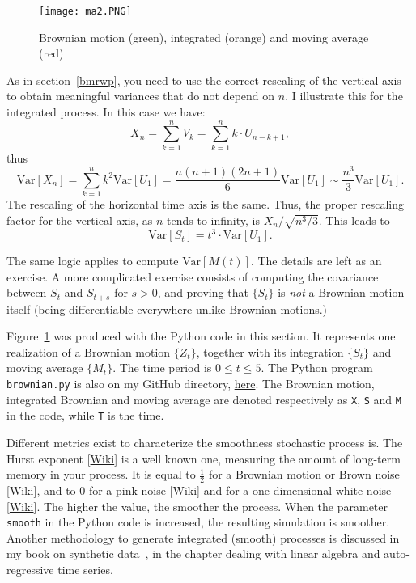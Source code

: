 \documentclass[oneside,10pt]{book}
\begin{document}
\begin{figure}[H]
\centering
\texttt{[image: ma2.PNG]} %
\caption{Brownian motion (green), integrated (orange) and moving average (red)}
\label{fig:trc}
\end{figure}

As in section~\ref{bmrwp}, you need to use the correct rescaling of the vertical axis to obtain meaningful variances that do not depend on $n$.
 I illustrate this for the integrated process. In this case we have:
$$
X_n = \sum_{k=1}^n V_k =\sum_{k=1}^n k\cdot U_{n-k+1},
$$
thus
$$
\text{Var}[X_n] = \sum_{k=1}^n k^2 \text{Var}[U_1] =\frac{n(n+1)(2n+1)}{6}\text{Var}[U_1]\sim \frac{n^3}{3}\text{Var}[U_1].
$$
The rescaling of the horizontal time axis is the same. Thus, the proper rescaling factor for the vertical axis, as $n$ tends to infinity, is  
$X_n / \sqrt{n^3/3}$. This leads to 
\begin{equation}
\text{Var}[S_t] = t^3 \cdot \text{Var}[U_1].\label{eq2}
\end{equation}

The same logic applies to compute $\text{Var}[M(t)]$. The details are left as an exercise. A more complicated exercise consists of computing the covariance between $S_t$ and $S_{t + s}$ for $s > 0$, and proving that $\{S_t\}$ is {\em not} a Brownian motion itself (being differentiable everywhere unlike Brownian motions.) 

Figure~\ref{fig:trc} was produced with the Python code in this section. It represents one realization of a Brownian motion $\{Z_t\}$, together with its integration $\{S_t\}$ and moving average $\{M_t\}$. The time period is $0\leq t \leq 5$. The Python program \texttt{brownian.py} is also on my
GitHub directory, \href{https://github.com/VincentGranville/Stochastic-Processes/blob/master/Brownian.py}{here}. 
The Brownian motion, integrated Brownian and moving average are denoted respectively as \texttt{X}, \texttt{S} and \texttt{M} in the code,
 while \texttt{T} is the time. 

Different metrics exist to characterize the smoothness stochastic process is. The 
\textcolor{index}{Hurst exponent} [\href{https://en.wikipedia.org/wiki/Hurst_exponent}{Wiki}] is a well known one, measuring the amount of long-term memory in your process. It is equal to $\frac{1}{2}$ for a Brownian motion or 
 \textcolor{index}{Brown noise} [\href{https://en.wikipedia.org/wiki/Brownian_noise}{Wiki}], and to 0
 for a \textcolor{index}{pink noise} [\href{https://en.wikipedia.org/wiki/Pink_noise}{Wiki}] and for a 
one-dimensional \textcolor{index}{white noise} [\href{https://en.wikipedia.org/wiki/White_noise}{Wiki}]. The higher the value, the smoother the process.  When the parameter \texttt{smooth} in the Python code is increased,
 the resulting simulation is smoother.  Another methodology to generate integrated (smooth) processes is discussed in my book on synthetic data~\cite{vgsynthetic}, in the chapter dealing with linear algebra and auto-regressive time series. 
\end{document}
